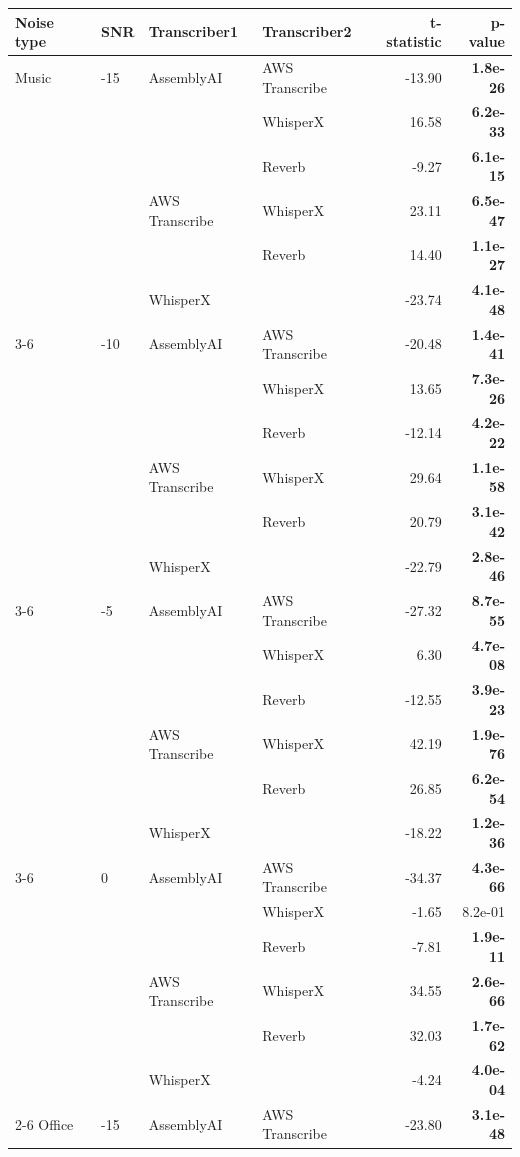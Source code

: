 \begin{tabular}{llllrr}
\toprule
Noise type & SNR & Transcriber1 & Transcriber2 & t-statistic & p-value \\
\midrule
Music & -15 & AssemblyAI & AWS Transcribe & -13.90 & \textbf{ 1.8e-26} \\
  &   &   & WhisperX & 16.58 & \textbf{ 6.2e-33} \\
  &   &   & Reverb & -9.27 & \textbf{ 6.1e-15} \\
  &   & AWS Transcribe & WhisperX & 23.11 & \textbf{ 6.5e-47} \\
  &   &   & Reverb & 14.40 & \textbf{ 1.1e-27} \\
  &   & WhisperX &   & -23.74 & \textbf{ 4.1e-48} \\
\cmidrule(r){3-6}
  & -10 & AssemblyAI & AWS Transcribe & -20.48 & \textbf{ 1.4e-41} \\
  &   &   & WhisperX & 13.65 & \textbf{ 7.3e-26} \\
  &   &   & Reverb & -12.14 & \textbf{ 4.2e-22} \\
  &   & AWS Transcribe & WhisperX & 29.64 & \textbf{ 1.1e-58} \\
  &   &   & Reverb & 20.79 & \textbf{ 3.1e-42} \\
  &   & WhisperX &   & -22.79 & \textbf{ 2.8e-46} \\
\cmidrule(r){3-6}
  & -5 & AssemblyAI & AWS Transcribe & -27.32 & \textbf{ 8.7e-55} \\
  &   &   & WhisperX & 6.30 & \textbf{ 4.7e-08} \\
  &   &   & Reverb & -12.55 & \textbf{ 3.9e-23} \\
  &   & AWS Transcribe & WhisperX & 42.19 & \textbf{ 1.9e-76} \\
  &   &   & Reverb & 26.85 & \textbf{ 6.2e-54} \\
  &   & WhisperX &   & -18.22 & \textbf{ 1.2e-36} \\
\cmidrule(r){3-6}
  & 0 & AssemblyAI & AWS Transcribe & -34.37 & \textbf{ 4.3e-66} \\
  &   &   & WhisperX & -1.65 &  8.2e-01 \\
  &   &   & Reverb & -7.81 & \textbf{ 1.9e-11} \\
  &   & AWS Transcribe & WhisperX & 34.55 & \textbf{ 2.6e-66} \\
  &   &   & Reverb & 32.03 & \textbf{ 1.7e-62} \\
  &   & WhisperX &   & -4.24 & \textbf{ 4.0e-04} \\
\cmidrule(r){2-6}
Office & -15 & AssemblyAI & AWS Transcribe & -23.80 & \textbf{ 3.1e-48} \\

\end{tabular}
